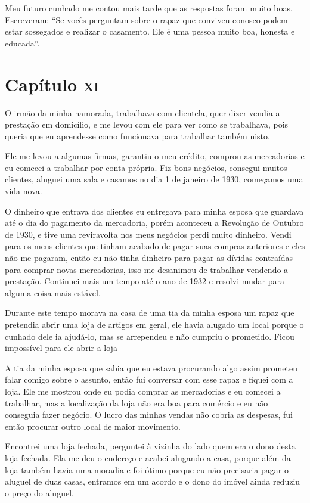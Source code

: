 Meu futuro cunhado me contou mais tarde que as respostas foram muito
boas. Escreveram: ``Se vocês perguntam sobre o rapaz que conviveu
conosco podem estar sossegados e realizar o casamento. Ele é uma pessoa
muito boa, honesta e educada''.

\chapter{Capítulo \textsc{xi}}

O irmão da minha namorada, trabalhava com clientela, quer dizer vendia a
prestação em domicílio, e me levou com ele para ver como se trabalhava,
pois queria que eu aprendesse como funcionava para trabalhar também
nisto.

Ele me levou a algumas firmas, garantiu o meu crédito, comprou as
mercadorias e eu comecei a trabalhar por conta própria. Fiz bons
negócios, consegui muitos clientes, aluguei uma sala e casamos no dia 1
de janeiro de 1930, começamos uma vida nova.

O dinheiro que entrava dos clientes eu entregava para minha esposa que
guardava até o dia do pagamento da mercadoria, porém aconteceu a
Revolução de Outubro de 1930, e tive uma reviravolta nos meus negócios
perdi muito dinheiro. Vendi para os meus clientes que tinham acabado de
pagar suas compras anteriores e eles não me pagaram, então eu não tinha
dinheiro para pagar as dívidas contraídas para comprar novas
mercadorias, isso me desanimou de trabalhar vendendo a prestação.
Continuei mais um tempo até o ano de 1932 e resolvi mudar para alguma
coisa mais estável.

Durante este tempo morava na casa de uma tia da minha esposa um rapaz
que pretendia abrir uma loja de artigos em geral, ele havia alugado um
local porque o cunhado dele ia ajudá-lo, mas se arrependeu e não cumpriu
o prometido. Ficou impossível para ele abrir a loja

A tia da minha esposa que sabia que eu estava procurando algo assim
prometeu falar comigo sobre o assunto, então fui conversar com esse
rapaz e fiquei com a loja. Ele me mostrou onde eu podia comprar as
mercadorias e eu comecei a trabalhar, mas a localização da loja não era
boa para comércio e eu não conseguia fazer negócio. O lucro das minhas
vendas não cobria as despesas, fui então procurar outro local de maior
movimento.

Encontrei uma loja fechada, perguntei à vizinha do lado quem era o dono
desta loja fechada. Ela me deu o endereço e acabei alugando a casa,
porque além da loja também havia uma moradia e foi ótimo porque eu não
precisaria pagar o aluguel de duas casas, entramos em um acordo e o dono
do imóvel ainda reduziu o preço do aluguel.

